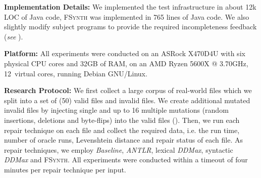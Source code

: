 \documentclass[sigconf,review,anonymous]{acmart}
\newcommand{\approach}{\textsc{FSynth}\xspace}
\newcommand{\ddmax}{\textit{DDMax}\xspace}
\begin{document}
\noindent\textbf{Implementation Details:}
We implemented the test infrastructure in about 12k LOC of Java code, \approach was implemented in 765 lines of Java code.
We also slightly modify subject programs %
to provide the required incompleteness feedback (\textit{see} ).

\noindent\textbf{Platform:} All experiments were conducted
on an ASRock X470D4U with six physical CPU cores and 32GB of RAM, on an AMD Ryzen 5600X @ 3.70GHz, 12~virtual cores, running Debian GNU/Linux.


\noindent\textbf{Research Protocol:}
We first collect a large corpus of  real-world files which we split into a set of (50) valid files and invalid files. We create additional mutated invalid files by injecting single and up to 16 multiple mutations (random insertions, deletions and byte-flips) into the valid files  
().
Then, we run each repair technique on each file and collect the required data, i.e. the run time, number of oracle runs, Levenshtein distance and repair status of each file.
As repair techniques, we employ \emph{Baseline}, %
\emph{ANTLR}, lexical \ddmax, syntactic \ddmax and \approach.
All experiments were conducted within a timeout of four minutes per repair technique per input. %
\end{document}
